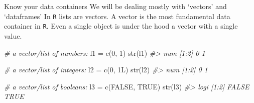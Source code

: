 \documentclass[
  11pt,
  ignorenonframetext,
  svgnames, handout, t]{beamer}
\newenvironment{Shaded}{\begin{snugshade}}{\end{snugshade}}
\newcommand{\CommentTok}[1]{\textcolor[rgb]{0.56,0.35,0.01}{\textit{#1}}}
\newcommand{\ConstantTok}[1]{\textcolor[rgb]{0.00,0.00,0.00}{#1}}
\newcommand{\DecValTok}[1]{\textcolor[rgb]{0.00,0.00,0.81}{#1}}
\newcommand{\FunctionTok}[1]{\textcolor[rgb]{0.00,0.00,0.00}{#1}}
\newcommand{\NormalTok}[1]{#1}
\newcommand{\OtherTok}[1]{\textcolor[rgb]{0.56,0.35,0.01}{#1}}
\begin{document}
\begin{frame}[fragile]{Know your data containers}
\protect\hypertarget{know-your-data-containers}{}
We will be dealing mostly with `vectors' and `dataframes' In \texttt{R}
lists are vectors. A vector is the most fundamental data container in
\texttt{R}. Even a single object is under the hood a vector with a
single value.

\footnotesize

\begin{Shaded}
\begin{Highlighting}[]
\CommentTok{\# a vector/list of numbers:}
\NormalTok{l1 }\OtherTok{=} \FunctionTok{c}\NormalTok{(}\DecValTok{0}\NormalTok{, }\DecValTok{1}\NormalTok{)}
\FunctionTok{str}\NormalTok{(l1)}
\CommentTok{\#\textgreater{}  num [1:2] 0 1}

\CommentTok{\# a vector/list of integers:}
\NormalTok{l2 }\OtherTok{=} \FunctionTok{c}\NormalTok{(}\DecValTok{0}\NormalTok{, 1L)}
\FunctionTok{str}\NormalTok{(l2)}
\CommentTok{\#\textgreater{}  num [1:2] 0 1}

\CommentTok{\# a vector/list of booleans:}
\NormalTok{l3 }\OtherTok{=} \FunctionTok{c}\NormalTok{(}\ConstantTok{FALSE}\NormalTok{, }\ConstantTok{TRUE}\NormalTok{)}
\FunctionTok{str}\NormalTok{(l3)}
\CommentTok{\#\textgreater{}  logi [1:2] FALSE TRUE}
\end{Highlighting}
\end{Shaded}

\normalsize
\end{frame}
\end{document}
